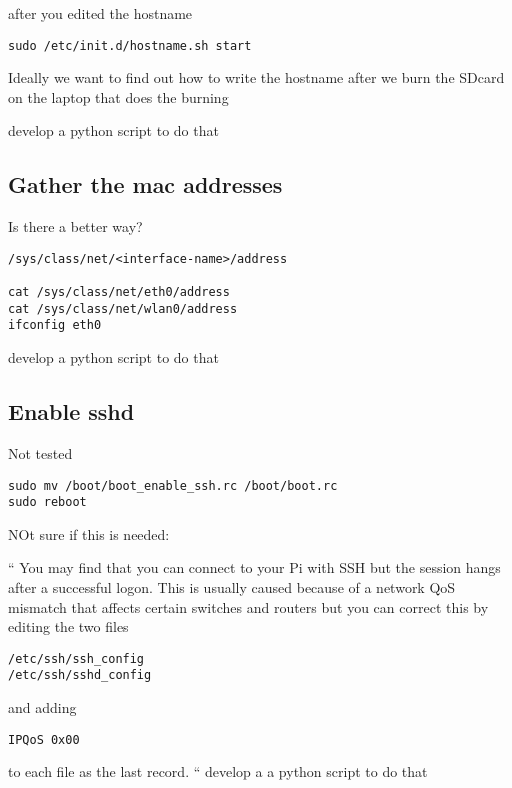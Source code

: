 after you edited the hostname

\begin{lstlisting}
sudo /etc/init.d/hostname.sh start
\end{lstlisting}

Ideally we want to find out how to write the hostname after we burn
the SDcard on the laptop that does the burning

develop a python script to do that

\subsection{Gather the mac addresses}

Is there a better way?

\begin{lstlisting}
/sys/class/net/<interface-name>/address

cat /sys/class/net/eth0/address
cat /sys/class/net/wlan0/address
ifconfig eth0
\end{lstlisting}

develop a python script to do that

\subsection{Enable sshd}

Not tested

\begin{lstlisting}
sudo mv /boot/boot_enable_ssh.rc /boot/boot.rc
sudo reboot
\end{lstlisting}


NOt sure if this is needed:

``
You may find that you can connect to your Pi with SSH but the session
hangs after a successful logon. This is usually caused because of a
network QoS mismatch that affects certain switches and routers but you
can correct this by editing the two files

\begin{lstlisting}
/etc/ssh/ssh_config
/etc/ssh/sshd_config
\end{lstlisting}

and adding

\begin{lstlisting}
IPQoS 0x00
\end{lstlisting}

to each file as the last record.
``
develop a a python script to do that

